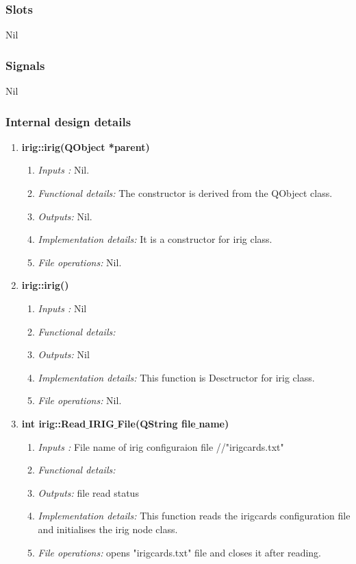 \subsubsection{Slots}
Nil
\subsubsection{Signals}
Nil
\subsubsection{Internal design details }
\begin{enumerate}
	\item  \textbf{irig::irig(QObject *parent)}
	\begin{enumerate}
		\item \textit{Inputs :} Nil.
		\item \textit{Functional details:} The constructor is derived from the QObject class.
		\item \textit{Outputs:} Nil.
		\item \textit{Implementation details:} It is a constructor for irig class.
		\item \textit{File operations:} Nil.
	\end{enumerate}
	
	\item  \textbf{irig::irig()}
	\begin{enumerate}
		\item \textit{Inputs :} Nil
		\item \textit{Functional details:} 
		\item \textit{Outputs:} Nil
		\item \textit{Implementation details:} This function is Desctructor for irig class.
		\item \textit{File operations:} Nil.
	\end{enumerate}
	
	\item  \textbf{int irig::Read$\_$IRIG$\_$File(QString file$\_$name)}
	\begin{enumerate}
		\item \textit{Inputs :} File name of irig configuraion file //"irigcards.txt"
		\item \textit{Functional details:} 
		\item \textit{Outputs:} file read status 
		\item \textit{Implementation details:} This function reads the irigcards configuration file and initialises the irig node class.
		\item \textit{File operations:} opens "irigcards.txt" file and closes it after reading.
	\end{enumerate}
	

	
\end{enumerate}




